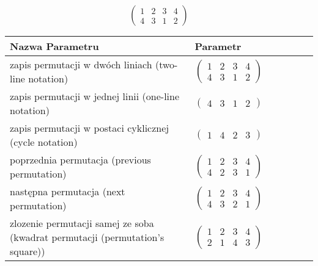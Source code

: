 \documentclass[12pt]{article}
\begin{document}
\subsection{}
\begin{center}
\[
\begin{pmatrix}
	1 & 2 & 3 & 4 \\ 
	4 & 3 & 1 & 2 
\end{pmatrix}
\]

\begin{tabular}{|m{0.6\linewidth}|m{0.4\linewidth}|}
	\hline
	Nazwa Parametru & Parametr \\
	\hline
	zapis permutacji w dwóch liniach (two-line notation) & $\begin{pmatrix} 1 & 2 & 3 & 4 \\ 
4 & 3 & 1 & 2 \end{pmatrix}$ \\ 
	\hline
	zapis permutacji w jednej linii (one-line notation) & $\begin{pmatrix} 4 & 3 & 1 & 2 \end{pmatrix}$ \\ 
	\hline
	zapis permutacji w postaci cyklicznej (cycle notation) & $\begin{pmatrix} 1 & 4 & 2 & 3 \end{pmatrix} $ \\ 
	\hline
	poprzednia permutacja (previous permutation) & $\begin{pmatrix} 1 & 2 & 3 & 4 \\ 
4 & 2 & 3 & 1 \end{pmatrix}$ \\ 
	\hline
	następna permutacja (next permutation) & $\begin{pmatrix} 1 & 2 & 3 & 4 \\ 
4 & 3 & 2 & 1 \end{pmatrix}$ \\ 
	\hline
	zlozenie permutacji samej ze soba (kwadrat permutacji (permutation's square)) & $\begin{pmatrix} 1 & 2 & 3 & 4 \\ 
2 & 1 & 4 & 3 \end{pmatrix}$ \\ 
	\hline
\end{tabular}
\end{center}
\end{document}
